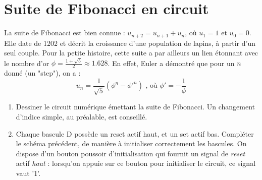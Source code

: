 \documentclass[a4paper,11pt]{article}
\begin{document}
\section{Suite de Fibonacci en circuit}
La suite de Fibonacci est bien connue : $u_{n+2}=u_{n+1}+u_{n}$, où $u_{1}=1$ et $u_0=0$.
Elle date de 1202 et décrit la croissance d'une population de lapins, à partir d'un seul couple.
Pour la petite histoire, cette suite a par ailleurs un lien étonnant avec le nombre d'or $\phi=\frac{1+\sqrt{5}}{2} \approx 1.628$.
En effet, Euler a démontré que pour un $n$ donné (un "step"), on a :
$$u_n=\frac{1}{\sqrt{5}}(\phi^n - \phi'^n) \textrm{ , où } \phi' = - \frac{1}{\phi}$$

\begin{enumerate}
  \item Dessiner le circuit numérique émettant la suite de Fibonacci. Un changement d'indice simple, au préalable, est conseillé.
  \item Chaque bascule D possède un reset actif haut, et un set actif bas. Compléter le schéma précédent, de manière à initialiser correctement les bascules. On dispose d'un bouton poussoir
  d'initialisation qui fournit un signal de {\it reset} actif {\it haut} : lorsqu'on appuie sur ce bouton pour initialiser le circuit, ce signal vaut '1'.
\end{enumerate}
\end{document}
